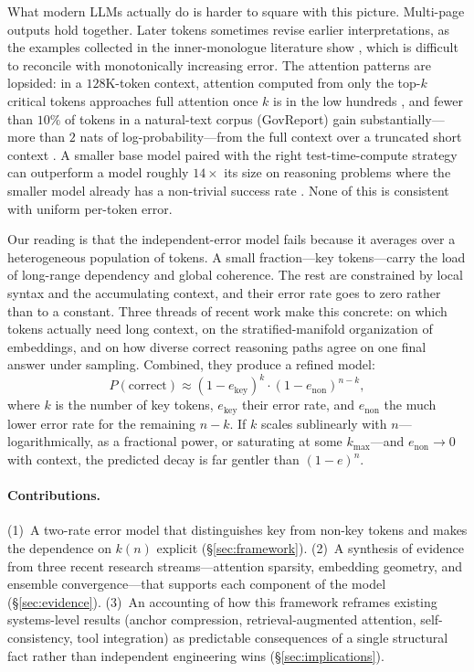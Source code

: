 What modern LLMs actually do is harder to square with this picture. Multi-page outputs hold together. Later tokens sometimes revise earlier interpretations, as the examples collected in the inner-monologue literature show \citep{gwern2023inner}, which is difficult to reconcile with monotonically increasing error. The attention patterns are lopsided: in a $128$K-token context, attention computed from only the top-$k$ critical tokens approaches full attention once $k$ is in the low hundreds \citep{liu2024retrieval}, and fewer than $10\%$ of tokens in a natural-text corpus (GovReport) gain substantially---more than $2$ nats of log-probability---from the full context over a truncated short context \citep{fang2024what}. A smaller base model paired with the right test-time-compute strategy can outperform a model roughly $14\times$ its size on reasoning problems where the smaller model already has a non-trivial success rate \citep{snell2024scaling}. None of this is consistent with uniform per-token error.

Our reading is that the independent-error model fails because it averages over a heterogeneous population of tokens. A small fraction---key tokens---carry the load of long-range dependency and global coherence. The rest are constrained by local syntax and the accumulating context, and their error rate goes to zero rather than to a constant. Three threads of recent work make this concrete: \citet{fang2024what} on which tokens actually need long context, \citet{li2025unraveling} on the stratified-manifold organization of embeddings, and \citet{wang2023self} on how diverse correct reasoning paths agree on one final answer under sampling. Combined, they produce a refined model:
\begin{equation}
\label{eq:two-rate}
P(\text{correct}) \approx (1-e_{\text{key}})^k \cdot (1-e_{\text{non}})^{n-k},
\end{equation}
where $k$ is the number of key tokens, $e_{\text{key}}$ their error rate, and $e_{\text{non}}$ the much lower error rate for the remaining $n-k$. If $k$ scales sublinearly with $n$---logarithmically, as a fractional power, or saturating at some $k_{\max}$---and $e_{\text{non}} \to 0$ with context, the predicted decay is far gentler than $(1-e)^n$.

\paragraph{Contributions.}
(1)~A two-rate error model that distinguishes key from non-key tokens and makes the dependence on $k(n)$ explicit (\S\ref{sec:framework}). (2)~A synthesis of evidence from three recent research streams---attention sparsity, embedding geometry, and ensemble convergence---that supports each component of the model (\S\ref{sec:evidence}). (3)~An accounting of how this framework reframes existing systems-level results (anchor compression, retrieval-augmented attention, self-consistency, tool integration) as predictable consequences of a single structural fact rather than independent engineering wins (\S\ref{sec:implications}).

